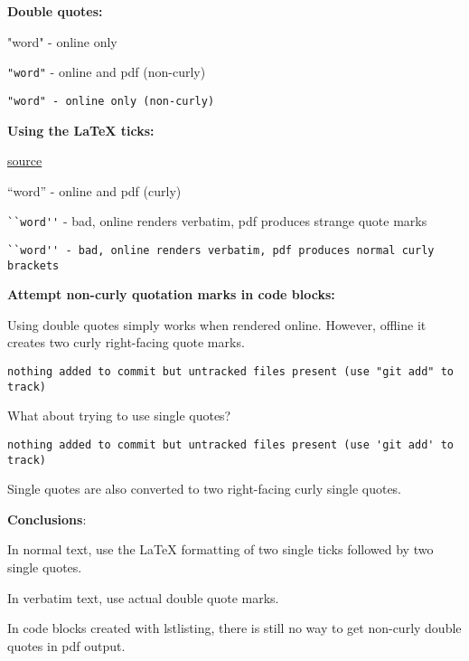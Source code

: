 \textbf{Double quotes:}

"word" - online only

\verb|"word"| - online and pdf (non-curly)

\begin{lstlisting}
"word" - online only (non-curly)
\end{lstlisting}

\textbf{Using the LaTeX ticks:}

\href{http://www.maths.tcd.ie/~dwilkins/LaTeXPrimer/QuotDash.html}{source}

``word'' - online and pdf (curly)

\verb|``word''| - bad, online renders verbatim, pdf produces strange quote marks

\begin{lstlisting}
``word'' - bad, online renders verbatim, pdf produces normal curly brackets
\end{lstlisting}

\textbf{Attempt non-curly quotation marks in code blocks:}

Using double quotes simply works when rendered online.
However, offline it creates two curly right-facing quote marks.

\begin{lstlisting}
nothing added to commit but untracked files present (use "git add" to track)
\end{lstlisting}

What about trying to use single quotes?

\begin{lstlisting}
nothing added to commit but untracked files present (use 'git add' to track)
\end{lstlisting}

Single quotes are also converted to two right-facing curly single quotes.

\textbf{Conclusions}:

In normal text, use the LaTeX formatting of two single ticks followed by two single quotes.

In verbatim text, use actual double quote marks.

In code blocks created with lstlisting, there is still no way to get non-curly double quotes in pdf output.